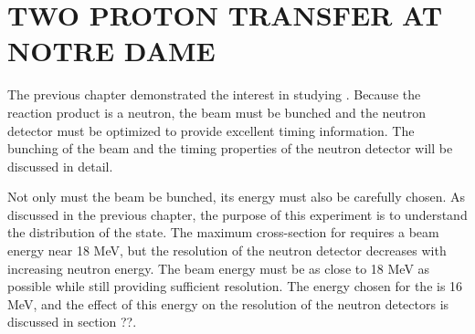 %
%
%
%
%
%
%
%

%
%

\chapter{TWO PROTON TRANSFER AT NOTRE DAME}
\label{chap:2pExpt}

The previous chapter demonstrated the interest in studying \reaction .  Because the reaction product is a neutron, the beam must be bunched and the neutron detector must be optimized to provide excellent timing information.  The bunching of the beam and the timing properties of the neutron detector will be discussed in detail.   


Not only must the beam be bunched, its energy must also be carefully chosen.  As discussed in the previous chapter, the purpose of this experiment is to understand the distribution of the \zp state.  The maximum \zp cross-section for \reaction requires a beam energy near 18 MeV, but the resolution of the neutron detector decreases with increasing neutron energy.  The beam energy must be as close to 18 MeV as possible while still providing sufficient resolution.  The energy chosen for the  is 16 MeV, and the effect of this energy on the resolution of the neutron detectors is discussed in section ??.


